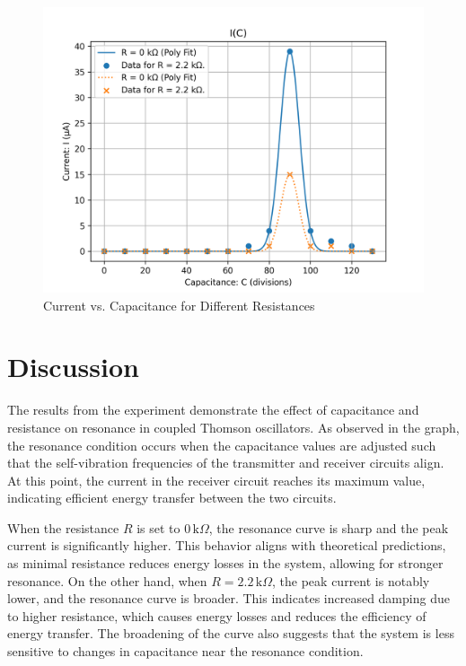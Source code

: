 \documentclass[journal]{IEEEtran}
\begin{document}
\begin{figure}[H]
    \centering
    \includegraphics[width=\linewidth]{output_plots/current_vs_Capacitance.png}
    \caption{Current vs. Capacitance for Different Resistances}
    \label{fig:current_vs_capacitance}
\end{figure}

\section{Discussion}
The results from the experiment demonstrate the effect of capacitance and resistance on resonance in coupled Thomson oscillators. As observed in the graph, the resonance condition occurs when the capacitance values are adjusted such that the self-vibration frequencies of the transmitter and receiver circuits align. At this point, the current in the receiver circuit reaches its maximum value, indicating efficient energy transfer between the two circuits.

When the resistance \( R \) is set to \( 0 \, \text{k}\Omega \), the resonance curve is sharp and the peak current is significantly higher. This behavior aligns with theoretical predictions, as minimal resistance reduces energy losses in the system, allowing for stronger resonance. On the other hand, when \( R = 2.2 \, \text{k}\Omega \), the peak current is notably lower, and the resonance curve is broader. This indicates increased damping due to higher resistance, which causes energy losses and reduces the efficiency of energy transfer. The broadening of the curve also suggests that the system is less sensitive to changes in capacitance near the resonance condition.
\end{document}
